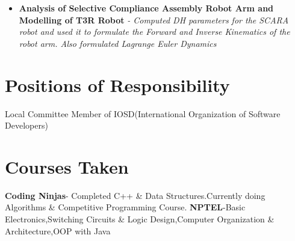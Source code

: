 \documentclass{article}
\begin{document}
\begin{itemize}
        \item{\textbf{\large{Analysis of Selective Compliance Assembly Robot Arm and Modelling of T3R Robot}}}
        \newline
        \textit{- Computed DH parameters for the SCARA robot and used it to formulate the Forward and Inverse Kinematics of the robot arm. Also formulated Lagrange Euler Dynamics}
    \end{itemize}
\section{Positions of Responsibility}
    \textmd{Local Committee Member of IOSD(International Organization of Software Developers)}
    \section{Courses Taken} 
    \textbf{Coding Ninjas}- Completed C++ \& Data Structures.Currently doing Algorithms \& Competitive Programming Course.
    \newline
    \textbf{NPTEL}-Basic Electronics,Switching Circuits \& Logic Design,Computer Organization \& Architecture,OOP with Java
    
\end{document}
